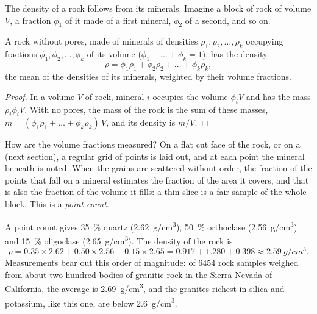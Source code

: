 The density of a rock follows from its minerals. Imagine a block of rock of
volume $V$, a fraction $\phi_1$ of it made of a first mineral, $\phi_2$ of a
second, and so on.

\begin{proposition}\label{prop:g11:minerals:density}
A rock without pores, made of minerals of densities $\rho_1, \rho_2, \dots,
\rho_k$ occupying fractions $\phi_1, \phi_2, \dots, \phi_k$ of its volume
($\phi_1 + \dots + \phi_k = 1$), has the density
\[
  \rho = \phi_1 \rho_1 + \phi_2 \rho_2 + \dots + \phi_k \rho_k ,
\]
the mean of the densities of its minerals, weighted by their volume
fractions.
\end{proposition}

\begin{proof}
In a volume $V$ of rock, mineral $i$ occupies the volume $\phi_i V$ and has
the mass $\rho_i \phi_i V$. With no pores, the mass of the rock is the sum of
these masses, $m = (\phi_1 \rho_1 + \dots + \phi_k \rho_k)\,V$, and its
density is $m/V$.
\end{proof}

How are the volume fractions measured? On a flat cut face of the rock, or on
a  (next section), a regular grid of points is laid out, and at
each point the mineral beneath is noted. When the grains are scattered
without order, the fraction of the points that fall on a mineral estimates
the fraction of the area it covers, and that is also the fraction of the
volume it fills: a thin slice is a fair sample of the whole block. This is a
\emph{point count}.

\begin{example}
A point count gives \qty{35}{\percent} quartz (\qty{2.62}{g/cm^3}),
\qty{50}{\percent} orthoclase (\qty{2.56}{g/cm^3}) and \qty{15}{\percent}
oligoclase (\qty{2.65}{g/cm^3}). The density of the rock is
\[
  \rho = 0.35 \times 2.62 + 0.50 \times 2.56 + 0.15 \times 2.65
       = 0.917 + 1.280 + 0.398 \approx \qty{2.59}{g/cm^3}.
\]
Measurements bear out this order of magnitude: of \num{6454} rock samples
weighed from about two hundred bodies of granitic rock in the Sierra Nevada of
California, the average is \qty{2.69}{g/cm^3}, and the granites richest in
silica and potassium, like this one, are below \qty{2.6}{g/cm^3}.
\end{example}

